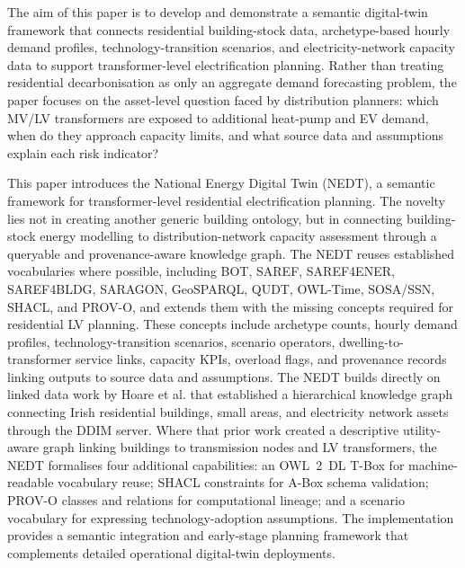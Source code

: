 \documentclass[preprint,12pt]{elsarticle}
\begin{document}
The aim of this paper is to develop and demonstrate a semantic digital-twin
framework that connects residential building-stock data, archetype-based
hourly demand profiles, technology-transition scenarios, and
electricity-network capacity data to support transformer-level
electrification planning.
Rather than treating residential decarbonisation as only an aggregate demand
forecasting problem, the paper focuses on the asset-level question faced by
distribution planners: which MV/LV transformers are exposed to additional
heat-pump and EV demand, when do they approach capacity limits, and what
source data and assumptions explain each risk indicator?

This paper introduces the National Energy Digital Twin (NEDT), a semantic
framework for transformer-level residential electrification planning.
The novelty lies not in creating another generic building ontology, but in
connecting building-stock energy modelling to distribution-network capacity
assessment through a queryable and provenance-aware knowledge graph.
The NEDT reuses established vocabularies where possible, including BOT,
SAREF, SAREF4ENER, SAREF4BLDG, SARAGON, GeoSPARQL, QUDT, OWL-Time,
SOSA/SSN, SHACL, and PROV-O, and extends them with the missing concepts
required for residential LV planning.
These concepts include archetype counts, hourly demand profiles,
technology-transition scenarios, scenario operators, dwelling-to-transformer
service links, capacity KPIs, overload flags, and provenance records linking
outputs to source data and assumptions. The NEDT builds directly on linked data work by Hoare et al. that established a hierarchical knowledge graph connecting Irish residential buildings, small areas, and electricity network assets through the DDIM server. Where that prior work created a descriptive utility-aware graph linking buildings to transmission nodes and LV transformers, the NEDT formalises four additional capabilities: an OWL~2~DL T-Box for machine-readable vocabulary reuse; SHACL constraints for A-Box schema validation; PROV-O classes and relations for computational lineage; and a scenario vocabulary for expressing technology-adoption assumptions. The implementation provides a semantic integration and early-stage planning framework that complements detailed operational digital-twin deployments.
\end{document}
